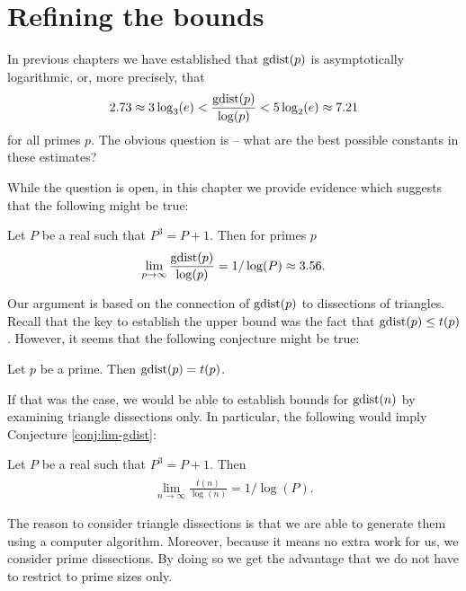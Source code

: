 \chapter{Refining the bounds}
\label{chap:bounds}

In previous chapters we have established that $\mathop{\mathrm{gdist}}(p)$ is asymptotically logarithmic, or, more precisely, that
\begin{align}
	2.73 \approx 3 \log_3(e) < \frac{\mathop{\mathrm{gdist}}(p)}{\log(p)} < 5 \log_2(e) \approx 7.21
\end{align}
for all primes $p$. The obvious question is -- what are the best possible constants in these estimates?

While the question is open, in this chapter we provide evidence which suggests that the following might be true:

\begin{conj}
\label{conj:lim-gdist}
Let $P$ be a real such that $P^3=P+1$. Then for primes $p$
\begin{align}
	\lim_{p \rightarrow \infty} \frac{\mathop{\mathrm{gdist}}(p)}{\log(p)} = 1/\log(P) \approx 3.56.
\end{align}
\end{conj}%

Our argument is based on the connection of $\mathop{\mathrm{gdist}}(p)$ to dissections of triangles. Recall that the key to establish the upper bound was the fact that $\mathop{\mathrm{gdist}}(p) \leq t(p)$. However, it seems that the following conjecture might be true:

\begin{conj}
\label{conj:gdistp-equals-tp}
Let $p$ be a prime. Then $\mathop{\mathrm{gdist}}(p) = t(p)$.
\end{conj}%

If that was the case, we would be able to establish bounds for $\mathop{\mathrm{gdist}}(n)$ by examining triangle dissections only. In particular, the following would imply Conjecture \ref{conj:lim-gdist}:

\begin{conj}
\label{conj:lim-hat-tn}
Let $P$ be a real such that $P^3=P+1$. Then
\begin{align}
	\lim_{n \rightarrow \infty} \frac{\hat t(n)}{\log(n)} = 1/\log(P).
\end{align}
\end{conj}%

The reason to consider triangle dissections is that we are able to generate them using a computer algorithm. Moreover, because it means no extra work for us, we consider prime dissections. By doing so we get the advantage that we do not have to restrict to prime sizes only.

